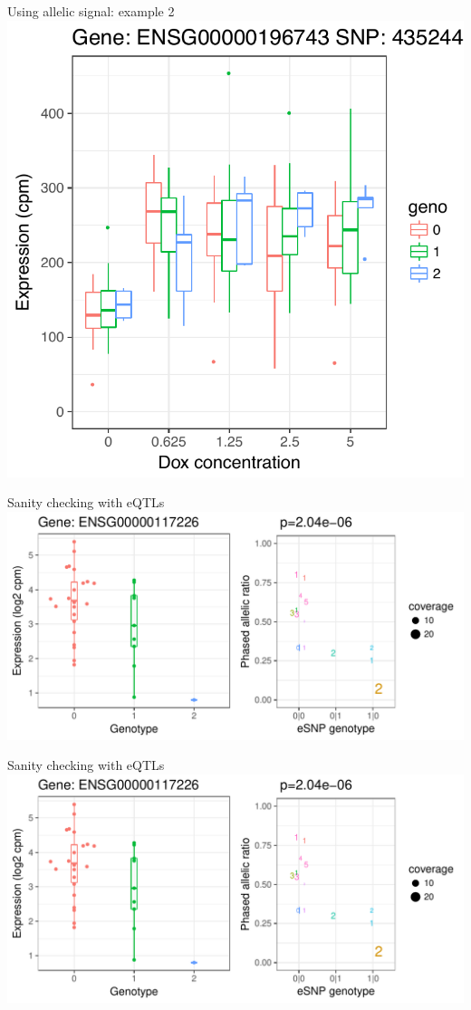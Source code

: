 \documentclass{beamer}
\begin{document}
\begin{frame}{Using allelic signal: example 2}
\centering
\includegraphics[width=.7\textwidth,clip,trim=0 0 0 0]{../figures/example_ai_vs_lrt.pdf}
\end{frame}

\begin{frame}{Sanity checking with eQTLs}
\includegraphics[page=3,width=\textwidth,clip,trim=0 0 0 0]{../figures/phasing_vs_eQTL.pdf} 
\end{frame}

\begin{frame}{Sanity checking with eQTLs}
\includegraphics[page=20,width=\textwidth,clip,trim=0 0 0 0]{../figures/phasing_vs_eQTL.pdf}
\end{frame}
\end{document}
